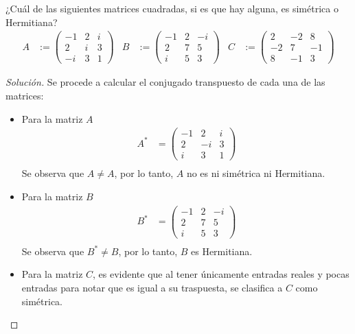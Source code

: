 \documentclass[12pt]{book}
\newenvironment{solucion}
  {\renewcommand\qedsymbol{$\square$}\begin{proof}[Solución]}
  {\end{proof}}
\begin{document}
\eje ¿Cuál de las siguientes matrices cuadradas, si es que hay alguna, es simétrica o Hermitiana?
\begin{align*}
    A&:=\begin{pmatrix} 
    -1 & 2 & i\\
    2 & i & 3\\
    -i & 3 & 1
    \end{pmatrix} & B&:=\begin{pmatrix}
    -1 & 2 & -i\\
    2 & 7 & 5\\
    i & 5 & 3
    \end{pmatrix} & C&:=\begin{pmatrix}
    2 & -2 & 8\\
    -2 & 7 & -1\\
    8 & -1 & 3
    \end{pmatrix}
\end{align*}

\begin{solucion}
Se procede a calcular el conjugado transpuesto de cada una de las matrices:
\begin{itemize}
    \item Para la matriz $A$
        \begin{align*}
        A^*&=\begin{pmatrix}
        -1 & 2 & i\\
        2 & -i & 3\\
        i & 3 & 1
        \end{pmatrix}\\
    \end{align*}
        Se observa que $A\neq A$, por lo tanto, $A$ no es ni simétrica ni Hermitiana.
    \item Para la matriz $B$
        \begin{align*}
            B^*&=\begin{pmatrix}
            -1 & 2 & -i\\
            2 & 7 & 5\\
            i & 5 & 3
            \end{pmatrix}\\
        \end{align*}
        Se observa que $B^*\neq B$, por lo tanto, $B$ es Hermitiana.
    \item Para la matriz $C$, es evidente que al tener únicamente entradas reales y pocas entradas para notar que es igual a su traspuesta, se clasifica a $C$ como simétrica.
        
\end{itemize}

\end{solucion}
\end{document}
